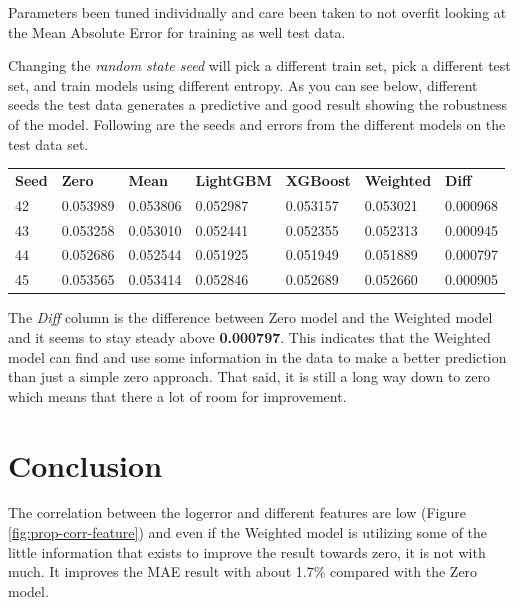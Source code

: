 \documentclass[a4paper]{article}
\begin{document}
Parameters been tuned individually and care been taken to not overfit looking at the Mean Absolute Error for training as well test data.

Changing the \textit{random state seed} will pick a different train set, pick a different test set, and train models using different entropy. As you can see below, different seeds the test data generates a predictive and good result showing the robustness of the model. Following are the seeds and errors from the different models on the test data set.
\begin{center}
\begin{tabular}{ l l l l l l l }
    \textbf{Seed} & \textbf{Zero} & \textbf{Mean} & \textbf{LightGBM} & \textbf{XGBoost} & \textbf{Weighted} & \textbf{Diff} \\
    42 & 0.053989 & 0.053806 & 0.052987 & 0.053157 & 0.053021 & 0.000968 \\
    43 & 0.053258 & 0.053010 & 0.052441 & 0.052355 & 0.052313 & 0.000945 \\
    44 & 0.052686 & 0.052544 & 0.051925 & 0.051949 & 0.051889 & 0.000797 \\
    45 & 0.053565 & 0.053414 & 0.052846 & 0.052689 & 0.052660 & 0.000905 \\
\end{tabular}
\end{center}
The \textit{Diff} column is the difference between Zero model and the Weighted model and it seems to stay steady above \textbf{0.000797}. This indicates that the Weighted model can find and use some information in the data to make a better prediction than just a simple zero approach. That said, it is still a long way down to zero which means that there a lot of room for improvement.


\section{Conclusion}
The correlation between the logerror and different features are low (Figure \ref{fig:prop-corr-feature}) and even if the Weighted model is utilizing some of the little information that exists to improve the result towards zero, it is not with much. It improves the MAE result with about 1.7\% compared with the Zero model. 
\end{document}
